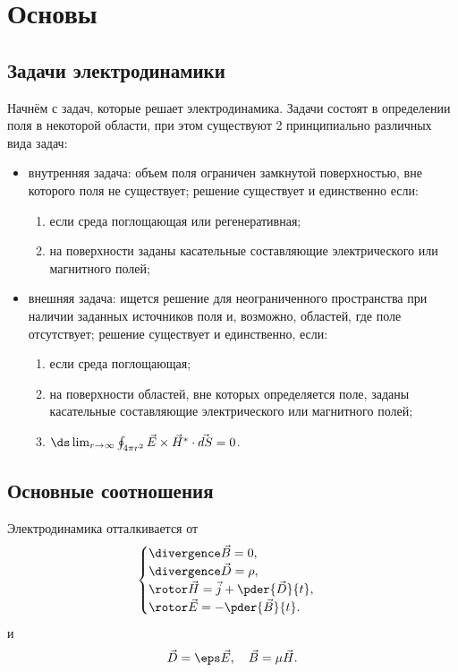 \chapter{Основы}

\section{Задачи электродинамики}
  Начнём с задач, которые решает электродинамика. Задачи состоят в определении поля в некоторой области, при этом существуют 2 принципиально различных вида задач:
  \begin{itemize}
  \item внутренняя задача: объем поля ограничен замкнутой поверхностью, вне
  которого поля не существует; решение существует и единственно если:
  \begin{enumerate}
  \item если среда поглощающая или регенеративная;
  \item на поверхности заданы касательные составляющие электрического или
  магнитного полей;
  \end{enumerate}
  \item внешняя задача: ищется решение для неограниченного пространства при
  наличии заданных источников поля и, возможно, областей, где поле отсутствует;
  решение существует и единственно, если:
    \begin{enumerate}
  \item если среда поглощающая;
  \item на поверхности областей, вне которых определяется поле, заданы
  касательные составляющие электрического или магнитного полей;
  \item \(\ds
        \lim_{r\to\infty}\oint_{4\pi r^2} \vec{E}\times\vec{H}^*\cdot\vec{dS} = 0 \).
  \end{enumerate}
  \end{itemize}

\section{Основные соотношения}
  Электродинамика отталкивается от 
  \[
    \begin{cases}
      \divergence\vec{B} = 0,\\
      \divergence\vec{D} = \rho,\\
      \rotor\vec{H} = \vec{j} + \pder{\vec{D}}{t},\\
      \rotor\vec{E} = -\pder{\vec{B}}{t}.
    \end{cases}
  \]
  и 
  \[
      \vec{D} = \eps\vec{E},\quad
      \vec{B} = \mu\vec{H}.
  \]
    
